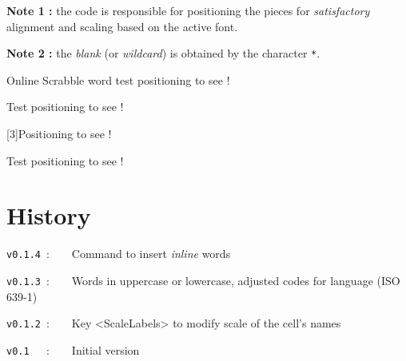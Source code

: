 \documentclass{article}
\begin{document}
\textbf{Note 1 :} the code is responsible for positioning the pieces for \textit{satisfactory} alignment and scaling based on the active font.

\smallskip

\textbf{Note 2 :} the \textit{blank} (or \textit{wildcard}) is obtained by the character \texttt{*}.

\begin{PresentationCode}{}
Online Scrabble word test positioning  to see !
\end{PresentationCode}

\begin{PresentationCode}{}
{\Huge\sffamily Test positioning  to see !}
\end{PresentationCode}

\begin{PresentationCode}{}
\scalebox{3}[3]{Positioning  to see !}
\end{PresentationCode}

\begin{PresentationCode}{}
{\LARGE Test positioning  to see !}
\end{PresentationCode}

\newpage

\part*{History}

\verb|v0.1.4|~:~~~~Command to insert \textit{inline} words

\verb|v0.1.3|~:~~~~Words in uppercase or lowercase, adjusted codes for language (ISO 639-1)

\verb|v0.1.2|~:~~~~Key \textsf{<ScaleLabels>} to modify scale of the cell's names

\verb|v0.1  |~:~~~~Initial version
\end{document}
